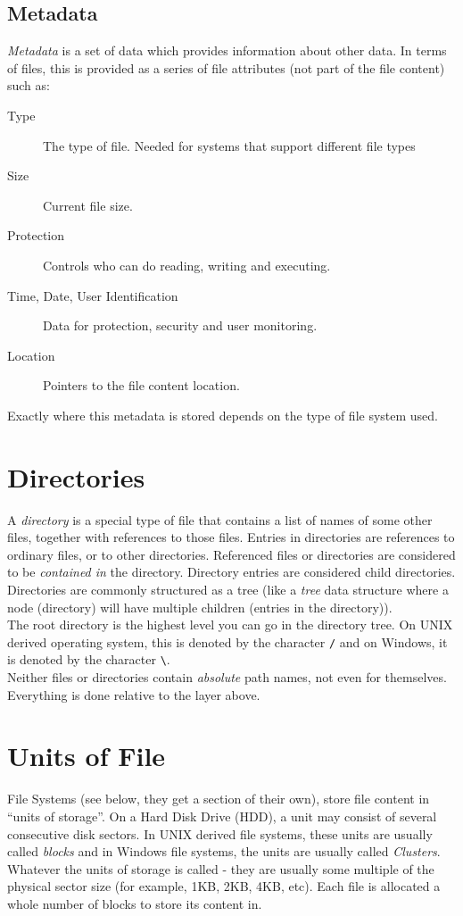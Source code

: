 \subsection{Metadata}
\textit{Metadata} is a set of data which provides information about other data. In terms of files, this is provided as a series of file attributes (not part of the file content) such as:
\begin{description}
    \item[Type] The type of file. Needed for systems that support different file types
    \item[Size] Current file size.
    \item[Protection] Controls who can do reading, writing and executing.
    \item[Time, Date, User Identification] Data for protection, security and user monitoring.
    \item[Location] Pointers to the file content location.
\end{description}

Exactly where this metadata is stored depends on the type of file system used.

\section{Directories}
A \textit{directory} is a special type of file that contains a list of names of some other files, together with references to those files. Entries in directories are references to ordinary files, or to other directories. Referenced files or directories are considered to be \textit{contained in} the directory. Directory entries are considered child directories.\\

Directories are commonly structured as a tree (like a \textit{tree} data structure where a node (directory) will have multiple children (entries in the directory)).\\

The root directory is the highest level you can go in the directory tree. On UNIX derived operating system, this is denoted by the character \verb|/| and on Windows, it is denoted by the character \verb|\|.\\

Neither files or directories contain \textit{absolute} path names, not even for themselves. Everything is done relative to the layer above.

\section{Units of File}
File Systems (see below, they get a section of their own), store file content in ``units of storage''. On a Hard Disk Drive (HDD), a unit may consist of several consecutive disk sectors. In UNIX derived file systems, these units are usually called \textit{blocks} and in Windows file systems, the units are usually called \textit{Clusters}. Whatever the units of storage is called - they are usually some multiple of the physical sector size (for example, 1KB, 2KB, 4KB, etc). Each file is allocated a whole number of blocks to store its content in. 

